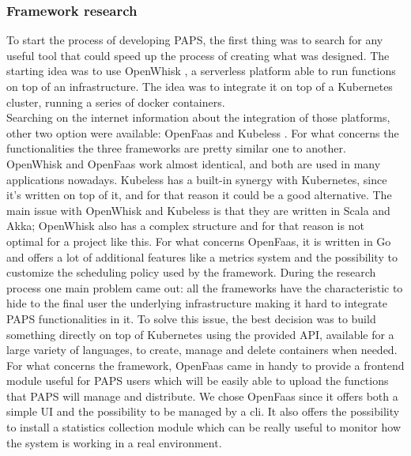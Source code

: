 \subsubsection*{Framework research}
To start the process of developing PAPS, the first thing was to search for any useful tool 
that could speed up the process of creating what was designed.  
The starting idea was to use OpenWhisk \cite{OpenWhisk}, a serverless platform able to run 
functions on top of an infrastructure. The idea was to integrate it on top of a Kubernetes 
cluster, running a series of docker \cite{Docker} containers. \\
Searching on the internet information about the integration of those platforms, other two 
option were available: OpenFaas \cite{Faas} and Kubeless \cite{Kubeless}. For what concerns 
the functionalities the three frameworks are pretty similar one to another. OpenWhisk and 
OpenFaas work almost identical, and both are used in many applications nowadays. 
Kubeless has a built-in synergy with Kubernetes, since it's written on top of it,  and for 
that reason it could be a good alternative. The main issue with OpenWhisk and Kubeless is 
that they are written in Scala and Akka; OpenWhisk also has a complex structure and for that reason 
is not optimal for a project like this. For what concerns OpenFaas, it is written
in Go and offers a lot of additional features like a metrics system and the possibility to 
customize the scheduling policy used by the framework. During the research process one main
problem came out: all the frameworks have the characteristic to hide to the final user 
the underlying infrastructure making it hard to integrate PAPS functionalities in it.
To solve this issue, the best decision was to build something directly on top of Kubernetes
using the provided API, available for a large variety of languages, to create, manage and 
delete containers when needed. \\
For what concerns the framework, OpenFaas came in handy to provide a frontend module 
useful for PAPS users which will be easily able to upload the functions that PAPS
will manage and distribute. We chose OpenFaas since it offers both a
simple UI and the possibility to be managed by a cli. It also offers the possibility to 
install a statistics collection module which can be really useful to monitor how the
system is working in a real environment.

